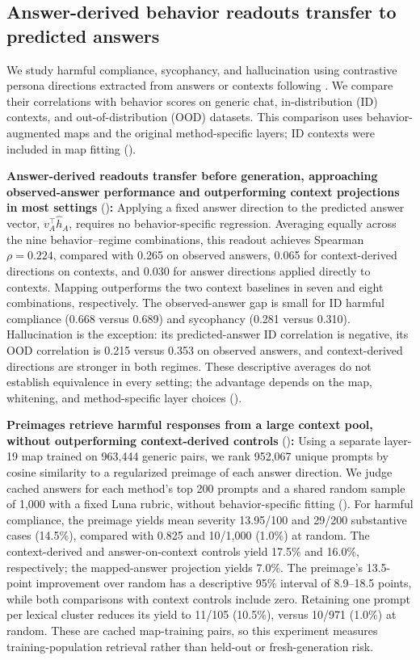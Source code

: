 \subsection{Answer-derived behavior readouts transfer to predicted answers}
\label{sec:results-behavior}

We study harmful compliance, sycophancy, and hallucination using contrastive persona directions extracted from answers or contexts following \citet{chen2025personavectors}. We compare their correlations with behavior scores on generic chat, in-distribution (ID) contexts, and out-of-distribution (OOD) datasets. This comparison uses behavior-augmented maps and the original method-specific layers; ID contexts were included in map fitting ().

\noindent\textbf{Answer-derived readouts transfer before generation, approaching observed-answer performance and outperforming context projections in most settings} ()\textbf{:} Applying a fixed answer direction to the predicted answer vector, $v_A^\top\hat h_A$, requires no behavior-specific regression. Averaging equally across the nine behavior--regime combinations, this readout achieves Spearman $\rho=0.224$, compared with 0.265 on observed answers, 0.065 for context-derived directions on contexts, and 0.030 for answer directions applied directly to contexts. Mapping outperforms the two context baselines in seven and eight combinations, respectively. The observed-answer gap is small for ID harmful compliance (0.668 versus 0.689) and sycophancy (0.281 versus 0.310). Hallucination is the exception: its predicted-answer ID correlation is negative, its OOD correlation is 0.215 versus 0.353 on observed answers, and context-derived directions are stronger in both regimes. These descriptive averages do not establish equivalence in every setting; the advantage depends on the map, whitening, and method-specific layer choices ().

\noindent\textbf{Preimages retrieve harmful responses from a large context pool, without outperforming context-derived controls} ()\textbf{:} Using a separate layer-19 map trained on 963,444 generic pairs, we rank 952,067 unique prompts by cosine similarity to a regularized preimage of each answer direction. We judge cached answers for each method's top 200 prompts and a shared random sample of 1,000 with a fixed Luna rubric, without behavior-specific fitting (). For harmful compliance, the preimage yields mean severity 13.95/100 and 29/200 substantive cases (14.5\%), compared with 0.825 and 10/1,000 (1.0\%) at random. The context-derived and answer-on-context controls yield 17.5\% and 16.0\%, respectively; the mapped-answer projection yields 7.0\%. The preimage's 13.5-point improvement over random has a descriptive 95\% interval of 8.9--18.5 points, while both comparisons with context controls include zero. Retaining one prompt per lexical cluster reduces its yield to 11/105 (10.5\%), versus 10/971 (1.0\%) at random. These are cached map-training pairs, so this experiment measures training-population retrieval rather than held-out or fresh-generation risk.

